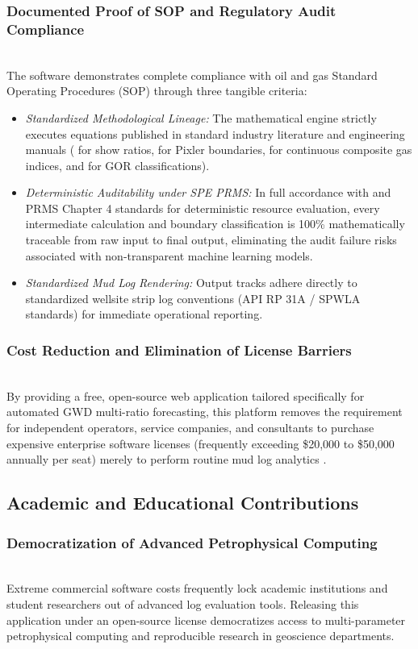 \subsubsection{Documented Proof of SOP and Regulatory Audit Compliance}~\\
The software demonstrates complete compliance with oil and gas Standard Operating Procedures (SOP) through three tangible criteria:
\begin{itemize}
    \item \textit{Standardized Methodological Lineage:} The mathematical engine strictly executes equations published in standard industry literature and engineering manuals (\citet{haworth1985} for show ratios, \citet{ref13} for Pixler boundaries, \citet{whittaker1991} for continuous composite gas indices, and \citet{spe2020} for GOR classifications).
    \item \textit{Deterministic Auditability under SPE PRMS:} In full accordance with \citet{ref2} and \citet{ref3} PRMS Chapter 4 standards for deterministic resource evaluation, every intermediate calculation and boundary classification is 100\% mathematically traceable from raw input to final output, eliminating the audit failure risks associated with non-transparent machine learning models.
    \item \textit{Standardized Mud Log Rendering:} Output tracks adhere directly to standardized wellsite strip log conventions (API RP 31A / SPWLA standards) for immediate operational reporting.
\end{itemize}

\subsubsection{Cost Reduction and Elimination of License Barriers}~\\
By providing a free, open-source web application tailored specifically for automated GWD multi-ratio forecasting, this platform removes the requirement for independent operators, service companies, and consultants to purchase expensive enterprise software licenses (frequently exceeding \$20,000 to \$50,000 annually per seat) merely to perform routine mud log analytics \citep{wood2020}.

\subsection{Academic and Educational Contributions}

\subsubsection{Democratization of Advanced Petrophysical Computing}~\\
Extreme commercial software costs frequently lock academic institutions and student researchers out of advanced log evaluation tools. Releasing this application under an open-source license democratizes access to multi-parameter petrophysical computing and reproducible research in geoscience departments.


